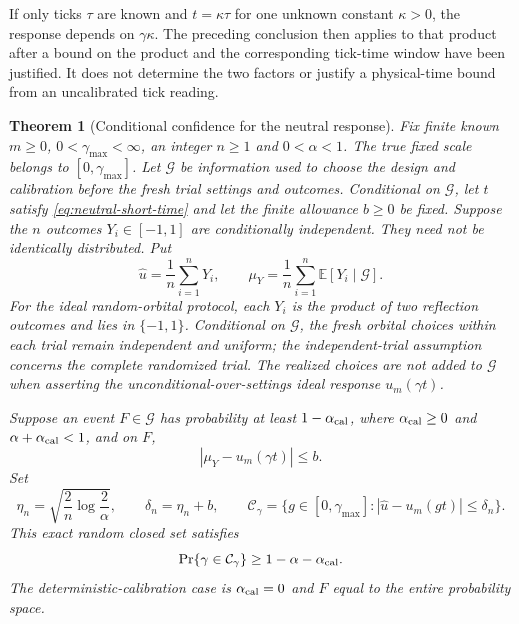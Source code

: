 \documentclass[11pt]{article}
\newtheorem{theorem}{Theorem}[section]
\theoremstyle{definition}
\begin{document}
If only ticks $\tau$ are known and $t=\kappa\tau$ for one unknown constant
$\kappa>0$, the response depends on $\gamma\kappa$. The preceding conclusion
then applies to that product after a bound on the product and the
corresponding tick-time window have been justified. It does not determine
the two factors or justify a physical-time bound from an uncalibrated
tick reading.

\begin{theorem}[Conditional confidence for the neutral response]
\label{thm:neutral-confidence}
Fix finite known $m\ge0$, $0<\gamma_{\max}<\infty$, an integer $n\ge1$
and $0<\alpha<1$. The true fixed scale belongs to
$[0,\gamma_{\max}]$. Let $\mathcal G$ be information used to choose the
design and calibration before the fresh trial settings and outcomes. Conditional on
$\mathcal G$, let $t$ satisfy \eqref{eq:neutral-short-time} and let the
finite allowance $b\ge0$ be fixed. Suppose the $n$ outcomes $Y_i\in[-1,1]$
are conditionally independent. They need not be identically distributed.
Put
\[
 \widehat u=\frac1n\sum_{i=1}^nY_i,\qquad
 \mu_Y=\frac1n\sum_{i=1}^n\mathbb E[Y_i\mid\mathcal G].
\]
For the ideal random-orbital protocol, each $Y_i$ is the product of two
reflection outcomes and lies in $\{-1,1\}$. Conditional on $\mathcal G$,
the fresh orbital choices within each trial remain independent and uniform;
the independent-trial assumption concerns the complete randomized trial.
The realized choices are not added to $\mathcal G$ when asserting the
unconditional-over-settings ideal response $u_m(\gamma t)$.

Suppose an event $F\in\mathcal G$ has probability at least
$1-\alpha_{\rm cal}$, where $\alpha_{\rm cal}\ge0$ and
$\alpha+\alpha_{\rm cal}<1$, and on $F$,
\[
 |\mu_Y-u_m(\gamma t)|\le b.
\]
Set
\[
 \eta_n=\sqrt{\frac2n\log\frac2\alpha},\qquad
 \delta_n=\eta_n+b,\qquad
 \mathcal C_\gamma=
 \{g\in[0,\gamma_{\max}]:
       |\widehat u-u_m(gt)|\le\delta_n\}.
\]
This exact random closed set satisfies
\begin{equation}
 \Pr\{\gamma\in\mathcal C_\gamma\}
       \ge1-\alpha-\alpha_{\rm cal}.
 \label{eq:neutral-coverage}
\end{equation}
The deterministic-calibration case is $\alpha_{\rm cal}=0$ and $F$ equal
to the entire probability space.
\end{theorem}
\end{document}
